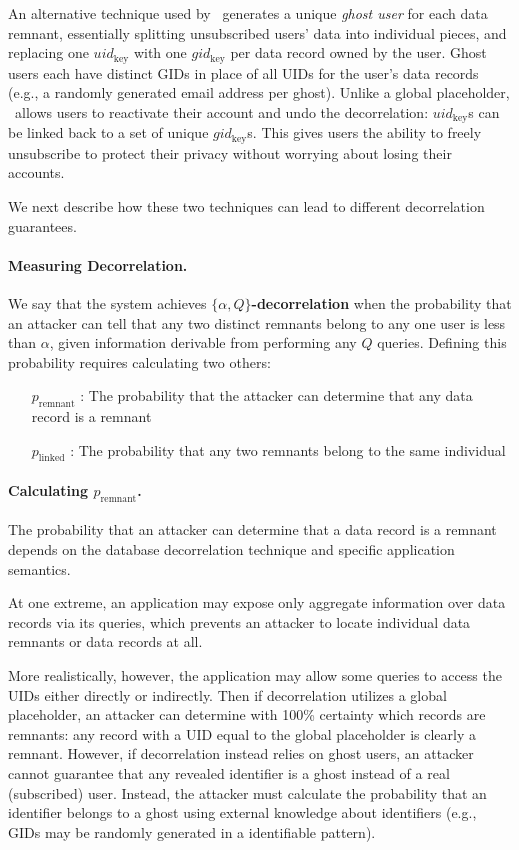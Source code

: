 An alternative technique used by \sys~generates a unique \emph{ghost user} for each data remnant,
essentially splitting unsubscribed users' data into individual pieces, and replacing one
$uid_\text{key}$ with one $gid_\text{key}$ per data record owned by the user. Ghost users each have
distinct GIDs in place of all UIDs for the user's data records (e.g., a randomly generated email
address per ghost).  Unlike a global placeholder, \sys~allows users to reactivate their account and
undo the decorrelation: $uid_\text{key}$s can be linked back to a set of unique $gid_\text{key}$s.
This gives users the ability to freely unsubscribe to protect their privacy without worrying about
losing their accounts.   

We next describe how these two techniques can lead to different decorrelation guarantees.

\paragraph{Measuring Decorrelation.} 
We say that the system achieves \textbf{$\{\alpha,Q\}$-decorrelation} when the probability that an attacker
can tell that any two distinct remnants belong to any one user is less than $\alpha$, given
information derivable from performing any $Q$ queries.
Defining this probability requires calculating two others: \begin{enumerate}
    \item[$p_{\text{remnant}}$]: 
        The probability that the attacker can determine that any data record is a remnant
    \item[$p_{\text{linked}}$]:
        The probability that any two remnants belong to the same individual
\end{enumerate}

\paragraph{Calculating $p_{\text{remnant}}$.}
The probability that an attacker can determine that a data record is a remnant depends on the
database decorrelation technique and specific application semantics.

At one extreme, an application may expose only aggregate information over data records via its
queries, which prevents an attacker to locate individual data remnants or data records at all. 

More realistically, however, the application may allow some queries to access the UIDs either
directly or indirectly. Then if decorrelation utilizes a global placeholder, an attacker can
determine with 100\% certainty which records are remnants: any record with a UID equal to the global
placeholder is clearly a remnant. However, if decorrelation instead relies on ghost users, an
attacker cannot guarantee that any revealed identifier is a ghost instead of a real (subscribed)
user. Instead, the attacker must calculate the probability that an identifier belongs to a ghost
using external knowledge about identifiers (e.g., GIDs may be randomly generated in a identifiable
pattern). 

